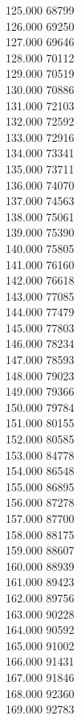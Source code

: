 { 125.000	68799 \\
 126.000	69250 \\
 127.000	69646 \\
 128.000	70112 \\
 129.000	70519 \\
 130.000	70886 \\
 131.000	72103 \\
 132.000	72592 \\
 133.000	72916 \\
 134.000	73341 \\
 135.000	73711 \\
 136.000	74070 \\
 137.000	74563 \\
 138.000	75061 \\
 139.000	75390 \\
 140.000	75805 \\
 141.000	76160 \\
 142.000	76618 \\
 143.000	77085 \\
 144.000	77479 \\
 145.000	77803 \\
 146.000	78234 \\
 147.000	78593 \\
 148.000	79023 \\
 149.000	79366 \\
 150.000	79784 \\
 151.000	80155 \\
 152.000	80585 \\
 153.000	84778 \\
 154.000	86548 \\
 155.000	86895 \\
 156.000	87278 \\
 157.000	87700 \\
 158.000	88175 \\
 159.000	88607 \\
 160.000	88939 \\
 161.000	89423 \\
 162.000	89756 \\
 163.000	90228 \\
 164.000	90592 \\
 165.000	91002 \\
 166.000	91431 \\
 167.000	91846 \\
 168.000	92360 \\
 169.000	92783 \\
}
